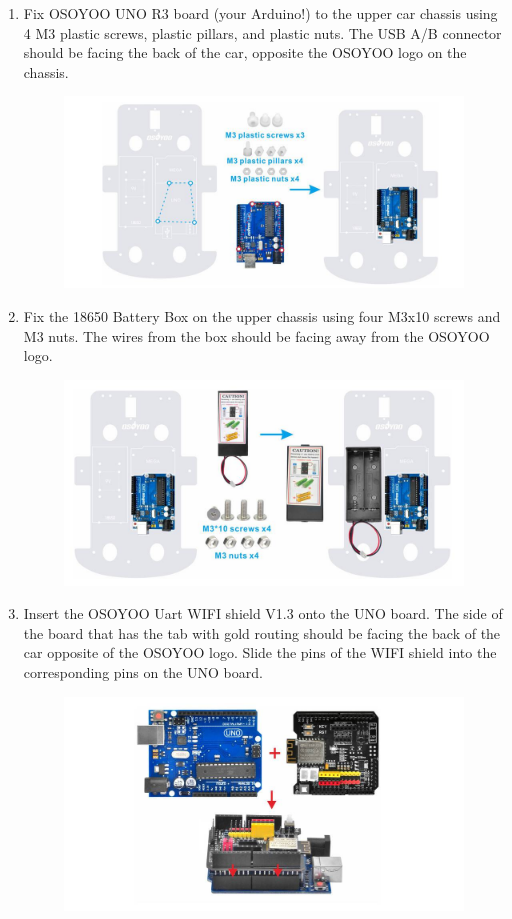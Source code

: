 \documentclass{article}
\begin{document}
\begin{enumerate}
		\item Fix OSOYOO UNO R3 board (your Arduino!) to the upper car chassis using 4 M3 plastic screws, plastic pillars, and plastic nuts. The USB A/B connector should be facing the back of the car, opposite the OSOYOO logo on the chassis.
		
		\begin{figure}[H]
			\centering
			\includegraphics[width=0.7\linewidth]{image6}
			\label{fig:image6}
		\end{figure}
		
		\item Fix the 18650 Battery Box on the upper chassis using four M3x10 screws and M3 nuts. The wires from the box should be facing away from the OSOYOO logo.
		
		\begin{figure}[H]
			\centering
			\includegraphics[width=0.7\linewidth]{image7}
			\label{fig:image7}
		\end{figure}
		
		\item Insert the OSOYOO Uart WIFI shield V1.3 onto the UNO board. The side of the board that has the tab with gold routing should be facing the back of the car opposite of the OSOYOO logo. Slide the pins of the WIFI shield into the corresponding pins on the UNO board.
		
		\begin{figure}[H]
			\centering
			\includegraphics[width=0.7\linewidth]{image8}
			\label{fig:image8}
		\end{figure}
		

\end{enumerate}
\end{document}
